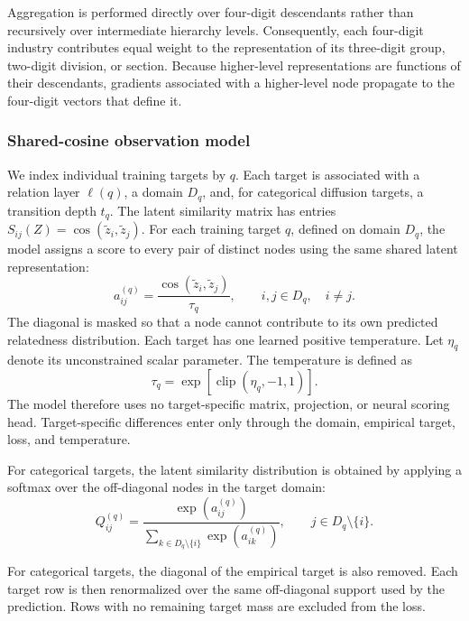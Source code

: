 \documentclass[9pt,twoside]{pnas-new}
\begin{document}
Aggregation is performed directly over four-digit descendants rather than
recursively over intermediate hierarchy levels. Consequently, each four-digit
industry contributes equal weight to the representation of its three-digit
group, two-digit division, or section. Because higher-level representations are
functions of their descendants, gradients associated with a higher-level node
propagate to the four-digit vectors that define it.

\subsubsection{Shared-cosine observation model}
\label{subsec:shared-cosine}
We index individual training targets by $q$. Each target is associated with a
relation layer $\ell(q)$, a domain $D_q$, and, for categorical diffusion
targets, a transition depth $t_q$.
The latent similarity matrix has entries $S_{ij}(Z)=\cos(\widetilde z_i,\widetilde z_j)$. For each training target $q$, defined on domain $D_q$, the model assigns a
score to every pair of distinct nodes using the same shared latent
representation:
\begin{equation}
a^{(q)}_{ij}
=
\frac{\cos\left(\widetilde{z}_i,\widetilde{z}_j\right)}
{\tau_q},
\qquad
i,j\in D_q,\quad i\neq j.
\label{eq:cosine-score}
\end{equation}
The diagonal is masked so that a node cannot contribute to its own predicted
relatedness distribution. Each target has one learned positive temperature.
Let $\eta_q$ denote its unconstrained scalar parameter. The temperature is
defined as
\begin{equation}
\tau_q
=
\exp\left[
\operatorname{clip}(\eta_q,-1,1)
\right].
\label{eq:temperature}
\end{equation}
The model therefore uses no target-specific matrix, projection, or neural
scoring head. Target-specific differences enter only through the domain,
empirical target, loss, and temperature.

For categorical targets, the latent similarity distribution is obtained by applying a softmax over the
off-diagonal nodes in the target domain:
\begin{equation}
Q^{(q)}_{ij}
=
\frac{\exp\left(a^{(q)}_{ij}\right)}
{\displaystyle\sum_{k\in D_q\setminus\{i\}}
\exp\left(a^{(q)}_{ik}\right)},
\qquad
j\in D_q\setminus\{i\}.
\label{eq:predicted-distribution}
\end{equation}

For categorical targets, the diagonal of the empirical target is also removed.
Each target row is then renormalized over the same off-diagonal support used by
the prediction. Rows with no remaining target mass are excluded from the loss.
\end{document}
